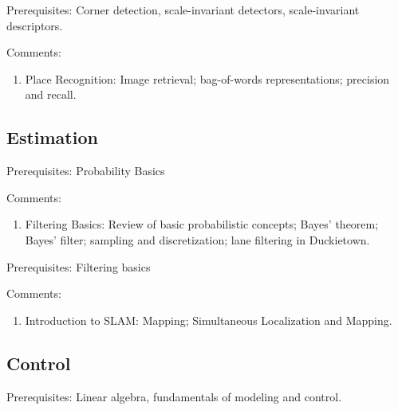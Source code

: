 \documentclass[12pt]{article}
\begin{document}

Prerequisites: Corner detection, scale-invariant detectors, scale-invariant descriptors. 

Comments: 

\begin{enumerate}

	\item Place Recognition: Image retrieval; bag-of-words representations; precision and recall.

\end{enumerate}



\subsection{Estimation}

Prerequisites: Probability Basics

Comments: 

\begin{enumerate}

	\item Filtering Basics: Review of basic probabilistic concepts; Bayes' theorem; Bayes' filter; sampling and discretization; lane filtering in Duckietown.

\end{enumerate}


Prerequisites: Filtering basics

Comments: 

\begin{enumerate}

	\item Introduction to SLAM: Mapping; Simultaneous Localization and Mapping.

\end{enumerate}


\subsection{Control}

Prerequisites: Linear algebra, fundamentals of modeling and control.
\end{document}
